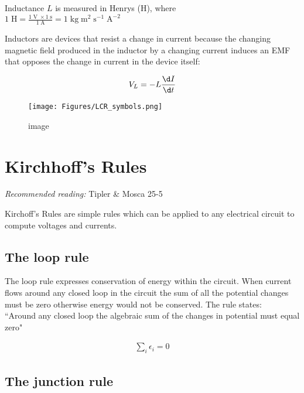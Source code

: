 \documentclass[
]{book}
\theoremstyle{definition}
\theoremstyle{definition}
\theoremstyle{definition}
\theoremstyle{definition}
\theoremstyle{remark}
\begin{document}
Inductance \(L\) is measured in Henrys (H), where\\
\(1 \; \text{H} = \frac{1 \; \text{V} \; \times 1 \; \text{s} } { 1 \; \text{A} } = 1 \; \text{kg} \; \text{m}^{2} \; \text{s}^{-1} \; \text{A}^{-2}\)

Inductors are devices that resist a change in current because the
changing magnetic field produced in the inductor by a changing current
induces an EMF that opposes the change in current in the device itself:

\[\begin{aligned}
V_L  = -L \frac{\d I}{\d t}
\end{aligned}\]

\begin{figure}
\centering
\texttt{[image: Figures/LCR\_symbols.png]}
\caption{image}
\end{figure}

\hypertarget{kirchhoffs-rules}{%
\section{Kirchhoff's Rules}\label{kirchhoffs-rules}}

\emph{Recommended reading:} Tipler \& Mosca 25-5

Kirchoff's Rules are simple rules which can be applied to any electrical
circuit to compute voltages and currents.

\hypertarget{the-loop-rule}{%
\subsection{The loop rule}\label{the-loop-rule}}

The loop rule expresses conservation of energy within the circuit. When
current flows around any closed loop in the circuit the sum of all the
potential changes must be zero otherwise energy would not be conserved.
The rule states:\\
``Around any closed loop the algebraic sum of the changes in potential
must equal zero"

\[\begin{aligned}
\sum_i \epsilon_i =0
\end{aligned}\]

\hypertarget{the-junction-rule}{%
\subsection{The junction rule}\label{the-junction-rule}}
\end{document}
